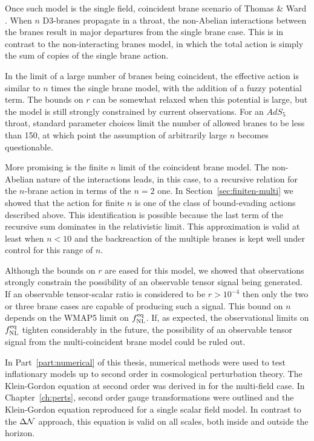 Once such model is the single field, coincident brane scenario of
Thomas \& Ward \cite{thomasward}. When $n$ D3-branes propagate in a throat, the
non-Abelian interactions between the branes result in major departures from the
single brane case. This is in contrast to the non-interacting branes model, in which
the total action is simply the sum of copies of the single brane action.

In the limit of a large number of branes being coincident, the effective action is
similar to $n$ times the single brane model, with the addition of a fuzzy potential
term. The bounds on $r$ can be somewhat relaxed when this potential is large,
but the model is still strongly constrained by current observations. For an $AdS_5$
throat, standard parameter choices limit the number of allowed branes to be
less than 150, at which point the assumption of arbitrarily large $n$ becomes
questionable.

More promising is the finite $n$ limit of the coincident brane model. The
non-Abelian nature of the interactions leads, in this case, to a recursive relation for
the $n$-brane action in terms of the $n=2$ one. In
Section~\ref{sec:finiten-multi} we showed that the action for finite $n$ is one of
the class of bound-evading actions described above. This identification is possible
because the last term of the recursive sum dominates in the relativistic limit. This
approximation is valid at least when $n<10$ and the backreaction of the multiple
branes is kept well under control for this range of $n$.

Although the bounds on $r$ are eased
for this model, we showed that observations strongly constrain the possibility of
an observable tensor signal being generated. If an observable tensor-scalar ratio is
considered to be $r>10^{-4}$ then only the two or three brane cases are capable of
producing such a signal. This bound on $n$ depends on the WMAP5 limit on $f_{\mathrm{NL}}^{\mathrm{eq}}$.
If, as expected, the observational limits on $f_{\mathrm{NL}}^{\mathrm{eq}}$ tighten considerably in the
future, the possibility of an observable tensor signal from the multi-coincident
brane model could be ruled out.

In Part~\ref{part:numerical} of this thesis, numerical methods were used to test inflationary
models up to second order in cosmological perturbation theory. The Klein-Gordon
equation at second order was derived in  for the multi-field
case. In Chapter~\ref{ch:perts}, second order gauge transformations were outlined
and the Klein-Gordon equation reproduced for a single scalar field model. In contrast to the
$\Delta \mathcal{N}$ approach, this equation is valid on all scales, both inside and outside
the horizon. 

